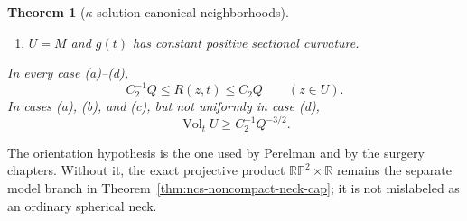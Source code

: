 \documentclass[10pt]{coll-l}
\newcommand{\R}{\mathbb{R}}
\newtheorem{theorem}{Theorem}[chapter]
\theoremstyle{definition}
\theoremstyle{remark}
\numberwithin{section}{chapter}
\numberwithin{equation}{chapter}
\newcommand{\Vol}{\operatorname{Vol}}
\begin{document}
\begin{theorem}[$\kappa$-solution canonical neighborhoods]
\begin{enumerate}
\item[(d)] $U=M$ and $g(t)$ has constant positive sectional curvature.
\end{enumerate}
In every case (a)--(d),
\begin{equation}
             C_2^{-1}Q\leq R(z,t)\leq C_2Q
             \qquad(z\in U).                          \label{eq:ncs-canonical-scalar}
\end{equation}
In cases (a), (b), and (c), but not uniformly in case (d),
\begin{equation}
                         \Vol_tU\geq C_2^{-1}Q^{-3/2}. \label{eq:ncs-canonical-volume}
\end{equation}
\end{theorem}

The orientation hypothesis is the one used by Perelman and by the surgery
chapters.  Without it, the exact projective product
$\mathbb{RP}^2\times\R$ remains the separate model branch in
Theorem~\ref{thm:ncs-noncompact-neck-cap}; it is not mislabeled as an
ordinary spherical neck.
\end{document}
